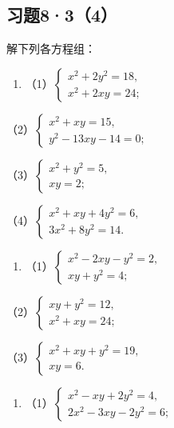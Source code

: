 \subsection{习题8·3（4）}

解下列各方程组：

\begin{enumerate}
\item
  （1）\(\left\{ \begin{array}{l} x^{2} + 2y^{2} = 18, \\ x^{2} + 2xy = 24; \end{array} \right.\)
\end{enumerate}

（2）\(\left\{ \begin{array}{l} x^{2} + xy = 15, \\ y^{2} - 13xy - 14 = 0; \end{array} \right.\)

（3）\(\left\{ \begin{array}{l} x^{2} + y^{2} = 5, \\ xy = 2; \end{array} \right.\)

（4）\(\left\{ \begin{array}{l} x^{2} + xy + 4y^{2} = 6, \\ 3x^{2} + 8y^{2} = 14. \end{array} \right.\)

\begin{enumerate}[start=2]
\item
  （1）\(\left\{ \begin{array}{l} x^{2} - 2xy - y^{2} = 2, \\ xy + y^{2} = 4; \end{array} \right.\)
\end{enumerate}

（2）\(\left\{ \begin{array}{l} xy + y^2 = 12, \\ x^2 + xy = 24; \end{array} \right.\)

（3）\(\left\{ \begin{array}{l} x^{2} + xy + y^{2} = 19, \\ xy = 6. \end{array} \right.\)

\begin{enumerate}[start=3]
\item
  （1）\(\left\{ \begin{array}{l} x^{2} - xy + 2y^{2} = 4, \\ 2x^{2} - 3xy - 2y^{2} = 6; \end{array} \right.\)
\end{enumerate}

